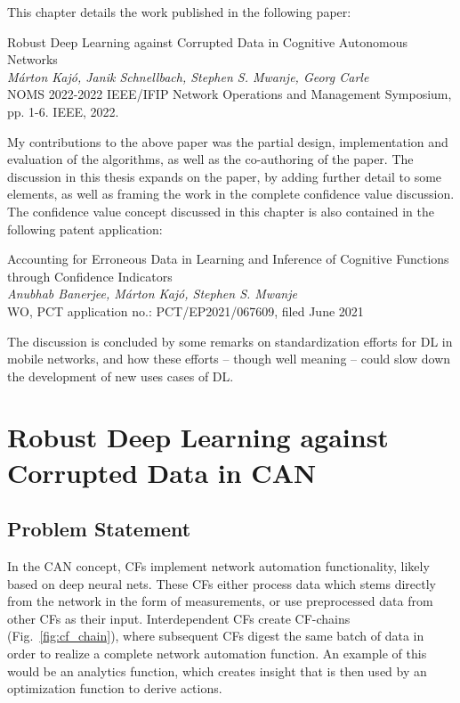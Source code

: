 	This chapter details the work published in the following paper:
	
	\begin{publication}
		Robust Deep Learning against Corrupted Data in Cognitive Autonomous Networks \\
		\textit{Márton Kajó, Janik Schnellbach, Stephen S. Mwanje, Georg Carle} \\
		NOMS 2022-2022 IEEE/IFIP Network Operations and Management Symposium, pp. 1-6. IEEE, 2022.
	\end{publication}

	My contributions to the above paper was the partial design, implementation and evaluation of the algorithms, as well as the co-authoring of the paper.
	The discussion in this thesis expands on the paper, by adding further detail to some elements, as well as framing the work in the complete confidence value	discussion.
	The confidence value concept discussed in this chapter is also contained in the following patent application:		
	
	\begin{patent}
		Accounting for Erroneous Data in Learning and Inference of Cognitive Functions through Confidence Indicators \\
		\textit{Anubhab Banerjee, Márton Kajó, Stephen S. Mwanje} \\
		WO, PCT application no.: PCT/EP2021/067609, filed June 2021
	\end{patent}

	The discussion is concluded by some remarks on standardization efforts for \ac{DL} in mobile networks, and how these efforts -- though well meaning -- could slow down the development of new uses cases of \ac{DL}.

	\section{Robust Deep Learning against Corrupted Data in CAN}
		\label{cha:imputation:sec:integrated_imp}

			\subsection{Problem Statement}

				In the \ac{CAN} concept, \acp{CF} implement network automation functionality, likely based on deep neural nets.
				These \acp{CF} either process data which stems directly from the network in the form of measurements, or use preprocessed data from other \acp{CF} as their input.
				Interdependent \acp{CF} create \ac{CF}-chains (Fig.~\ref{fig:cf_chain}), where subsequent \acp{CF} digest the same batch of data in order to realize a complete network automation function.
				An example of this would be an analytics function, which creates insight that is then used by an optimization function to derive actions.
				
